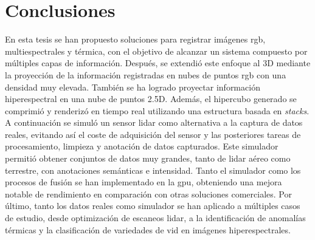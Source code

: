 \setchapterpreamble[u]{\margintoc}
\chapter{Conclusiones}
\label{sec:conclusions_spanish}

En esta tesis se han propuesto soluciones para registrar imágenes \acrshort{rgb}, multiespectrales y térmica, con el objetivo de alcanzar un sistema compuesto por múltiples capas de información. Después, se extendió este enfoque al 3D mediante la proyección de la información registradas en nubes de puntos \acrshort{rgb} con una densidad muy elevada. También se ha logrado proyectar información hiperespectral en una nube de puntos 2.5D. Además, el hipercubo generado se comprimió y renderizó en tiempo real utilizando una estructura basada en \textit{stacks}. A continuación se simuló un sensor \acrshort{lidar} como alternativa a la captura de datos reales, evitando así el coste de adquisición del sensor y las posteriores tareas de procesamiento, limpieza y anotación de datos capturados. Este simulador permitió obtener conjuntos de datos muy grandes, tanto de \acrshort{lidar} aéreo como terrestre, con anotaciones semánticas e intensidad. Tanto el simulador como los procesos de fusión se han implementado en la \acrshort{gpu}, obteniendo una mejora notable de rendimiento en comparación con otras soluciones comerciales. Por último, tanto los datos reales como simulador se han aplicado a múltiples casos de estudio, desde optimización de escaneos \acrshort{lidar}, a la identificación de anomalías térmicas y la clasificación de variedades de vid en imágenes hiperespectrales. 


